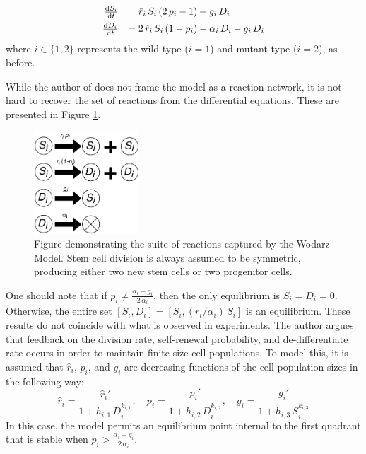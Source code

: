 \documentclass[12pt]{article}
\renewcommand{\d}{{\rm d}}
\begin{document}
\begin{equation}
\begin{array}{rl}
\frac{\d S_i}{\d t}&= \hat{r}_i\,S_i\,(2\,p_i-1)+g_i\,D_i\vspace*{5pt}\\
\frac{\d D_i}{\d t}&= 2\,\hat{r}_i\,S_i\,(1-p_i)-\alpha_i\,D_i-g_i\,D_i
\end{array}\label{wodDE}
\end{equation}
where $i\in\{1,2\}$ represents the wild type ($i=1$) and mutant type ($i=2$), as before.

While the author of \cite{wodarz} does not frame the model as a reaction network, it is not hard to recover the set of reactions from the differential equations. These are presented in Figure \ref{wodarzRxns}. 

\begin{figure}
\begin{center}
\includegraphics[width=0.35\textwidth]{Wodarz_Rxns.pdf}
\end{center}
\caption{Figure demonstrating the suite of reactions captured by the Wodarz Model. Stem cell division is always assumed to be symmetric, producing either two new stem cells or two progenitor cells.}\label{wodarzRxns}
\end{figure}

One should note that if $p_i\neq \frac{\alpha_i-g_i}{2\,\alpha_i}$, then the only equilibrium is $S_i=D_i=0$. Otherwise, the entire set $[S_i,D_i]=[S_i,(r_i/\alpha_i)\,S_i]$ is an equilibrium.  These results do not coincide with what is observed in experiments. The author argues that feedback on the division rate, self-renewal probability, and de-differentiate rate occurs in order to maintain finite-size cell populations. To model this, it is assumed that $\hat{r}_i$, $p_i$, and $g_i$ are decreasing functions of the cell population sizes in the following way:
\[
\hat{r}_i=\frac{\hat{r}_i'}{1+h_{i,1}\,D_i^{k_{i,1}}}, \quad p_i=\frac{p_i'}{1+h_{i,2}\,D_i^{k_{i,2}}}, \quad g_i=\frac{g_i'}{1+h_{i,3}\,S_i^{k_{i,3}}}
\]
In this case, the model permits an equilibrium point internal to the first quadrant that is stable when $p_i>\frac{\alpha_i-g_i}{2\,\alpha_i}$.
\end{document}
